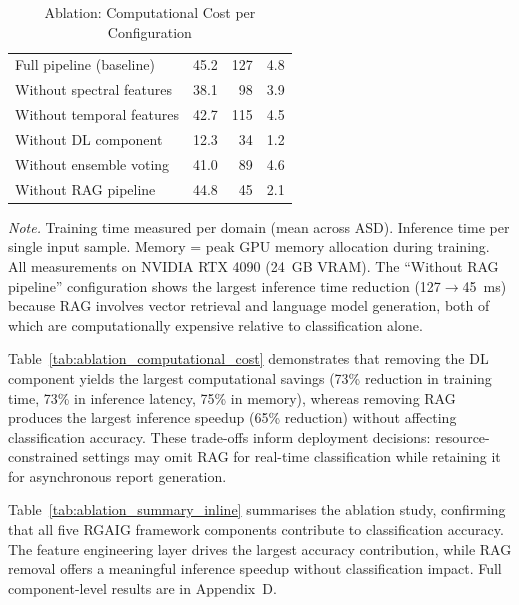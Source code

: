\begin{table}[!htbp]
\tablefontsize
\caption{Ablation: Computational Cost per Configuration}
\begin{tabularx}{\textwidth}{@{} L r r r @{}}
\toprule
{} &  &  &  \\
\midrule
Full pipeline (baseline) & 45.2 & 127 & 4.8 \\
Without spectral features & 38.1 & 98 & 3.9 \\
Without temporal features & 42.7 & 115 & 4.5 \\
Without DL component & 12.3 & 34 & 1.2 \\
Without ensemble voting & 41.0 & 89 & 4.6 \\
Without RAG pipeline & 44.8 & 45 & 2.1 \\
\bottomrule
\end{tabularx}
\vspace{0.5em}\noindent\textit{Note.} Training time measured per domain (mean across ASD). Inference time per single input sample. Memory = peak GPU memory allocation during training. All measurements on NVIDIA RTX 4090 (24~GB VRAM). The ``Without RAG pipeline'' configuration shows the largest inference time reduction (127$\to$45~ms) because RAG involves vector retrieval and language model generation, both of which are computationally expensive relative to classification alone.
\end{table}

\noindent Table~\ref{tab:ablation_computational_cost} demonstrates that removing the DL component yields the largest computational savings (73\% reduction in training time, 73\% in inference latency, 75\% in memory), whereas removing RAG produces the largest inference speedup (65\% reduction) without affecting classification accuracy. These trade-offs inform deployment decisions: resource-constrained settings may omit RAG for real-time classification while retaining it for asynchronous report generation.

\fi %

Table~\ref{tab:ablation_summary_inline} summarises the ablation study, confirming that all five RGAIG framework components contribute to classification accuracy. The feature engineering layer drives the largest accuracy contribution, while RAG removal offers a meaningful inference speedup without classification impact. Full component-level results are in Appendix~D.

